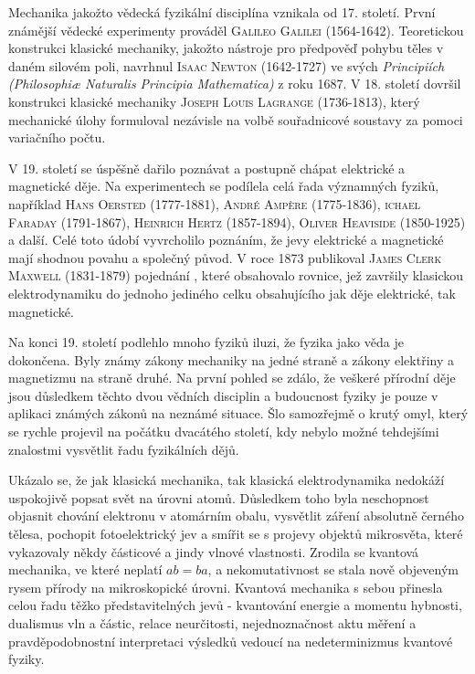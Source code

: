     Mechanika jakožto vědecká fyzikální disciplína vznikala od 17. století. První známější vědecké
    experimenty prováděl \textsc{Galileo Galilei} (1564-1642). Teoretickou konstrukci klasické
    mechaniky, jakožto nástroje pro předpověď pohybu těles v daném silovém poli, navrhnul
    \textsc{Isaac Newton} (1642-1727) ve svých \emph{Principiích (Philosophiæ Naturalis Principia
    Mathematica)} z roku 1687. V 18. století dovršil konstrukci klasické mechaniky \textsc{Joseph
    Louis Lagrange} (1736-1813), který mechanické úlohy formuloval nezávisle na volbě souřadnicové
    soustavy za pomoci variačního počtu.
    
    V 19. století se úspěšně dařilo poznávat a postupně chápat elektrické a magnetické děje. Na
    experimentech se podílela celá řada významných fyziků, například \textsc{Hans Oersted}
    (1777-1881), \textsc{André Ampère} (1775-1836), \textsc{ichael Faraday} (1791-1867),
    \textsc{Heinrich Hertz} (1857-1894), \textsc{Oliver Heaviside} (1850-1925) a další. Celé toto
    údobí vyvrcholilo poznáním, že jevy elektrické a magnetické mají shodnou povahu a společný
    původ. V roce 1873 publikoval \textsc{James Clerk Maxwell} (1831-1879) pojednání , které obsahovalo rovnice, jež završily klasickou elektrodynamiku
    do jednoho jediného celku obsahujícího jak děje elektrické, tak magnetické. 
    
    Na konci 19. století podlehlo mnoho fyziků iluzi, že fyzika jako věda je dokončena. Byly známy
    zákony mechaniky na jedné straně a zákony elektřiny a magnetizmu na straně druhé. Na první
    pohled se zdálo, že veškeré přírodní děje jsou důsledkem těchto dvou vědních disciplin a
    budoucnost fyziky je pouze v aplikaci známých zákonů na neznámé situace. Šlo samozřejmě o krutý
    omyl, který se rychle projevil na počátku dvacátého století, kdy nebylo možné tehdejšími
    znalostmi vysvětlit řadu fyzikálních dějů. 

    Ukázalo se, že jak klasická mechanika, tak klasická elektrodynamika nedokáží uspokojivě popsat
    svět na úrovni atomů. Důsledkem toho byla neschopnost objasnit chování elektronu v atomárním
    obalu, vysvětlit záření absolutně černého tělesa, pochopit fotoelektrický jev a smířit se s
    projevy objektů mikrosvěta, které vykazovaly někdy částicové a jindy vlnové vlastnosti. Zrodila
    se kvantová mechanika, ve které neplatí \(ab = ba\), a nekomutativnost se stala nově objeveným
    rysem přírody na mikroskopické úrovni. Kvantová mechanika s sebou přinesla celou řadu těžko
    představitelných jevů - kvantování energie a momentu hybnosti, dualismus vln a částic, relace
    neurčitosti, nejednoznačnost aktu měření a pravděpodobnostní interpretaci výsledků vedoucí na
    nedeterminizmus kvantové fyziky.

